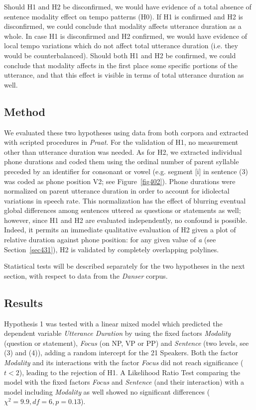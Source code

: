 Should H1 and H2 be disconfirmed, we would have evidence of a total absence of sentence modality effect on tempo patterns (H0). If H1 is confirmed and H2 is disconfirmed, we could conclude that modality affects utterance duration as a whole. In case H1 is disconfirmed and H2 confirmed, we would have evidence of local tempo variations which do not affect total utterance duration (i.e. they would be counterbalanced). Should both H1 and H2 be confirmed, we could conclude that modality affects in the first place some specific portions of the utterance, and that this effect is visible in terms of total utterance duration as well. 

\subsection{Method}\label{sec432}
We evaluated these two hypotheses using data from both corpora and extracted with scripted procedures in \textit{Praat}. For the validation of H1, no measurement other than utterance duration was needed. As for H2, we extracted individual phone durations and coded them using the ordinal number of parent syllable preceded by an identifier for consonant or vowel (e.g. segment [i] in sentence (3) was coded as phone position V2; see  Figure~\ref{fig402}). Phone durations were normalized on parent utterance duration in order to account for idiolectal variations in speech rate. This normalization has the effect of blurring eventual global differences among sentences uttered as questions or statements as well; however, since H1 and H2 are evaluated independently, no confound is possible. Indeed, it permits an immediate qualitative evaluation of H2 given a plot of relative duration against phone position: for any given value of \textit{a} (see Section~\ref{sec431}), H2 is validated by completely overlapping polylines. 

Statistical tests will be described separately for the two hypotheses in the next section, with respect to data from the \textit{Danser} corpus.

\subsection{Results}\label{sec433}

Hypothesis 1 was tested with a linear mixed model which predicted the dependent variable \textit{Utterance Duration} by using the fixed factors \textit{Modality} (question or statement), \textit{Focus} (on NP, VP or PP) and \textit{Sentence} (two levels, see (3) and (4)), adding a random intercept for the 21 Speakers. Both the factor \textit{Modality} and its interactions with the factor \textit{Focus} did not reach significance ($t<2$), leading to the rejection of H1. A Likelihood Ratio Test comparing the model with the fixed factors \textit{Focus} and \textit{Sentence} (and their interaction) with a model including \textit{Modality} as well showed no significant differences ($\chi^{2}=9.9, df=6, p=0.13$). 

